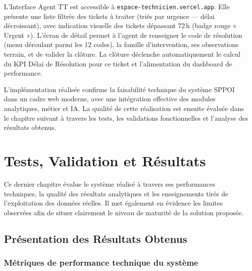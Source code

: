 \documentclass[10pt,a4paper]{report}
\newcommand{\chapintro}[1]{%
  \begin{tcolorbox}[introbox]
    #1
  \end{tcolorbox}%
  \vspace{8pt}%
}
\newcommand{\chapconclusion}[1]{%
  \vspace{8pt}%
  \begin{tcolorbox}[conclusionbox]
    #1
  \end{tcolorbox}%
}
\begin{document}
L'Interface Agent TT est accessible à \texttt{espace-technicien.vercel.app}. Elle présente une liste filtrée des tickets à traiter (triés par urgence --- délai décroissant), avec indication visuelle des tickets dépassant 72\,h (badge rouge « Urgent »). L'écran de détail permet à l'agent de renseigner le code de résolution (menu déroulant parmi les 12 codes), la famille d'intervention, ses observations terrain, et de valider la clôture. La clôture déclenche automatiquement le calcul du KPI Délai de Résolution pour ce ticket et l'alimentation du dashboard de performance.

\chapconclusion{%
L'implémentation réalisée confirme la faisabilité technique du système SPPOI dans un cadre web moderne, avec une intégration effective des modules analytiques, métier et IA. La qualité de cette réalisation est ensuite évaluée dans le chapitre suivant à travers les tests, les validations fonctionnelles et l'analyse des résultats obtenus.%
}


\chapter{Tests, Validation et Résultats}

\chapintro{%
Ce dernier chapitre évalue le système réalisé à travers ses performances techniques, la qualité des résultats analytiques et les enseignements tirés de l'exploitation des données réelles. Il met également en évidence les limites observées afin de situer clairement le niveau de maturité de la solution proposée.%
}


\section{Présentation des Résultats Obtenus}

\subsection{Métriques de performance technique du système}
\end{document}
